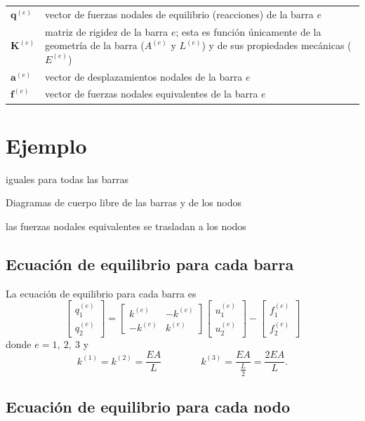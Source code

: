 \documentclass[12pt,letterpaper]{article}
\newcommand{\ve}[1]{{\boldsymbol{#1}}}
\newcommand{\ma}[1]{{\boldsymbol{#1}}}
\begin{document}
\begin{tabular}{p{0.7cm} p{14cm}}
	$\ve{q}^{(e)}$ & vector de fuerzas nodales de equilibrio (reacciones) de la barra $e$ \\
	$\ma{K}^{(e)}$ & matriz de rigidez de la barra $e$; esta es función únicamente de la geometría de la barra ($A^{(e)}$ y $L^{(e)}$) y de sus propiedades mecánicas ($E^{(e)}$) \\
	$\ve{a}^{(e)}$ & vector de desplazamientos nodales de la barra $e$ \\
	$\ve{f}^{(e)}$ & vector de fuerzas nodales equivalentes de la barra $e$
\end{tabular}

\section{Ejemplo}
iguales para todas las barras

Diagramas de cuerpo libre de las barras y de los nodos

las fuerzas nodales equivalentes se trasladan a los nodos

\subsection{Ecuación de equilibrio para cada barra}
La ecuación de equilibrio para cada barra es
\begin{equation}
\begin{bmatrix}
	q_1^{(e)}\\ 
	q_2^{(e)}
\end{bmatrix}
=
\begin{bmatrix}
	k^{(e)} & -k^{(e)}\\ 
	-k^{(e)} &  k^{(e)}
\end{bmatrix}
\begin{bmatrix}
	u_1^{(e)}\\ 
	u_2^{(e)}
\end{bmatrix}
-
\begin{bmatrix}
	f_1^{(e)}\\ 
	f_2^{(e)}
\end{bmatrix}
\end{equation}
donde $e = 1,\ 2,\ 3$ y 
\begin{equation}
k^{(1)}=k^{(2)}=\frac{EA}{L} \qquad \qquad k^{(3)}=\frac{EA}{\frac{L}{2}}=\frac{2EA}{L}.
\end{equation}

\subsection{Ecuación de equilibrio para cada nodo}
\end{document}
